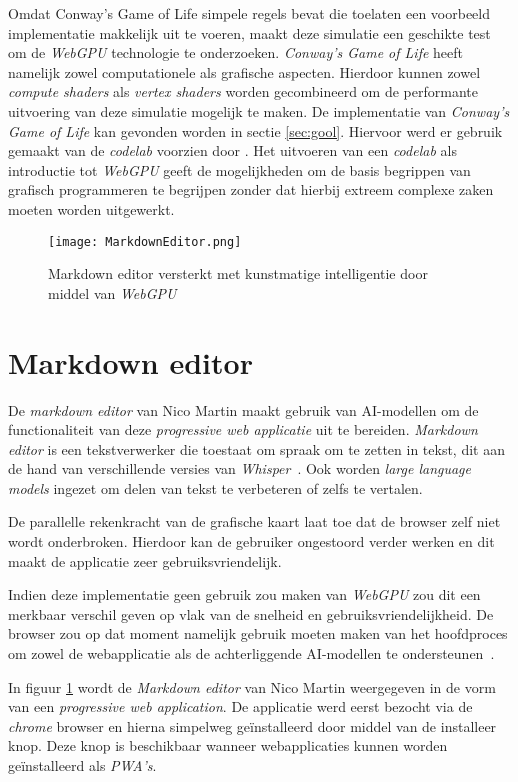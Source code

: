 Omdat Conway's Game of Life simpele regels bevat die toelaten een voorbeeld implementatie makkelijk uit te voeren, maakt deze simulatie een geschikte test om de \textit{WebGPU} technologie te onderzoeken. \textit{Conway's Game of Life} heeft namelijk zowel computationele als grafische aspecten. Hierdoor kunnen zowel \textit{compute shaders} als \textit{vertex shaders} worden gecombineerd om de performante uitvoering van deze simulatie mogelijk te maken. De implementatie van \textit{Conway's Game of Life} kan gevonden worden in sectie \ref{sec:gool}. Hiervoor werd er gebruik gemaakt van de \textit{codelab} voorzien door \textcite{google2023}. Het uitvoeren van een \textit{codelab} als introductie tot \textit{WebGPU} geeft de mogelijkheden om de basis begrippen van grafisch programmeren te begrijpen zonder dat hierbij extreem complexe zaken moeten worden uitgewerkt.

\begin{figure}
    \texttt{[image: MarkdownEditor.png]}
    \caption[Markdown editor met AI en \textit{WebGPU}~\autocite{Martin2020}]{
        Markdown editor versterkt met kunstmatige intelligentie door middel van \textit{WebGPU}~\autocite{Martin2020}
    }
    \label{fig:MardownEditor}
\end{figure}

\section{Markdown editor}

De \textit{markdown editor} van Nico Martin maakt gebruik van AI-modellen om de functionaliteit van deze \textit{progressive web applicatie} uit te bereiden. \textit{Markdown editor} is een tekstverwerker die toestaat om spraak om te zetten in tekst, dit aan de hand van verschillende versies van \textit{Whisper}~\autocite{radford2022whisper}. Ook worden \textit{large language models} ingezet om delen van tekst te verbeteren of zelfs te vertalen. 

\bigbreak{}

De parallelle rekenkracht van de grafische kaart laat toe dat de browser zelf niet wordt onderbroken. Hierdoor kan de gebruiker ongestoord verder werken en dit maakt de applicatie zeer gebruiksvriendelijk.

\bigbreak{}

Indien deze implementatie geen gebruik zou maken van \textit{WebGPU} zou dit een merkbaar verschil geven op vlak van de snelheid en gebruiksvriendelijkheid. De browser zou op dat moment namelijk gebruik moeten maken van het hoofdproces om  zowel de webapplicatie als de achterliggende AI-modellen te ondersteunen~\autocite{Martin2020}.

\bigbreak{}

In figuur \ref{fig:MardownEditor} wordt de \textit{Markdown editor} van Nico Martin weergegeven in de vorm van een \textit{progressive web application}. De applicatie werd eerst bezocht via de \textit{chrome} browser en hierna simpelweg geïnstalleerd door middel van de installeer knop. Deze knop is beschikbaar wanneer webapplicaties kunnen worden geïnstalleerd als \textit{PWA's}.